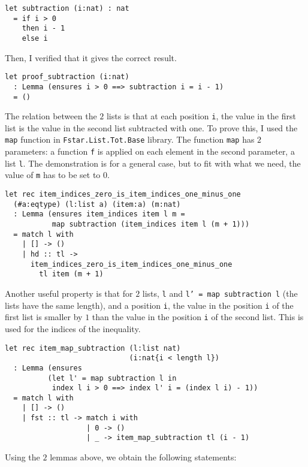 \begin{verbatim}
let subtraction (i:nat) : nat 
  = if i > 0 
    then i - 1
    else i
\end{verbatim}

Then, I verified that it gives the correct result.

\begin{verbatim}
let proof_subtraction (i:nat)
  : Lemma (ensures i > 0 ==> subtraction i = i - 1)
  = ()
\end{verbatim}

The relation between the \(2\) lists is that at each position \texttt{i}, the value in the first list is the value in the second list subtracted with one. To prove this, I used the \texttt{map} function in \texttt{Fstar.List.Tot.Base} library. The function \texttt{map} has \(2\) parameters: a function \texttt{f} is applied on each element in the second parameter, a list \texttt{l}. The demonstration is for a general case, but to fit with what we need, the value of \texttt{m} has to be set to \(0\).

\begin{verbatim}
let rec item_indices_zero_is_item_indices_one_minus_one 
  (#a:eqtype) (l:list a) (item:a) (m:nat)
  : Lemma (ensures item_indices item l m =
           map subtraction (item_indices item l (m + 1)))
  = match l with 
    | [] -> ()
    | hd :: tl -> 
      item_indices_zero_is_item_indices_one_minus_one 
        tl item (m + 1)
\end{verbatim}

Another useful property is that for \(2\) lists, \texttt{l} and \texttt{l' = map subtraction l} (the lists have the same length), and a position \texttt{i}, the value in the position \texttt{i} of the first list is smaller by \(1\) than the value in the position \texttt{i} of the second list. This is used for the indices of the inequality.

\begin{verbatim}
let rec item_map_subtraction (l:list nat) 
                             (i:nat{i < length l})
  : Lemma (ensures 
          (let l' = map subtraction l in
           index l i > 0 ==> index l' i = (index l i) - 1))
  = match l with 
    | [] -> ()
    | fst :: tl -> match i with  
                   | 0 -> ()
                   | _ -> item_map_subtraction tl (i - 1)
\end{verbatim}

Using the \(2\) lemmas above, we obtain the following statements:

